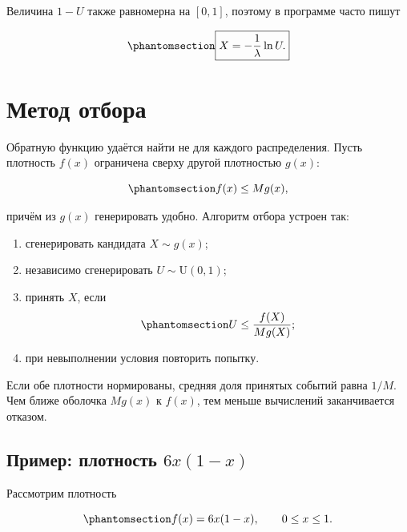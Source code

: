 \documentclass[
  russian,
  11pt,
  a4paper,
  open=any]{scrbook}
\providecommand{\tightlist}{%
  \setlength{\itemsep}{0pt}\setlength{\parskip}{0pt}}
\begin{document}
Величина \(1-U\) также равномерна на \([0,1]\), поэтому в программе
часто пишут

\begin{equation}\protect\phantomsection\label{eq-ch8-exponential-generator}{
\boxed{X=-\frac{1}{\lambda}\ln U.}
}\end{equation}

\section{Метод
отбора}\label{ux43cux435ux442ux43eux434-ux43eux442ux431ux43eux440ux430}

Обратную функцию удаётся найти не для каждого распределения. Пусть
плотность \(f(x)\) ограничена сверху другой плотностью \(g(x)\):

\begin{equation}\protect\phantomsection\label{eq-ch8-rejection-envelope}{
f(x)\leq M g(x),
}\end{equation}

причём из \(g(x)\) генерировать удобно. Алгоритм отбора устроен так:

\begin{enumerate}
\def\labelenumi{\arabic{enumi}.}
\tightlist
\item
  сгенерировать кандидата \(X\sim g(x)\);
\item
  независимо сгенерировать \(U\sim\mathrm U(0,1)\);
\item
  принять \(X\), если
  \begin{equation}\protect\phantomsection\label{eq-ch8-rejection-condition}{
  U\leq\frac{f(X)}{M g(X)};
  }\end{equation}
\item
  при невыполнении условия повторить попытку.
\end{enumerate}

Если обе плотности нормированы, средняя доля принятых событий равна
\(1/M\). Чем ближе оболочка \(Mg(x)\) к \(f(x)\), тем меньше вычислений
заканчивается отказом.

\subsection{\texorpdfstring{Пример: плотность
\(6x(1-x)\)}{Пример: плотность 6x(1-x)}}\label{interactive-monte-carlo-rejection-sampling}

Рассмотрим плотность

\begin{equation}\protect\phantomsection\label{eq-ch8-rejection-example-density}{
f(x)=6x(1-x),
\qquad 0\leq x\leq1.
}\end{equation}
\end{document}
